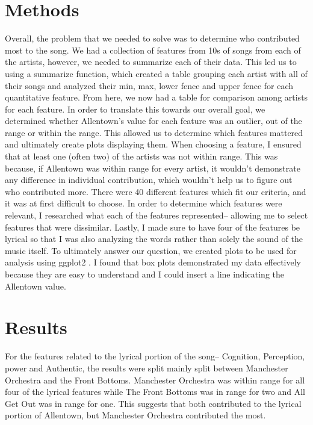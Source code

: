 \documentclass{article}\usepackage[]{graphicx}\usepackage[]{xcolor}
\begin{document}
\begin{multicols}{2}
\section{Methods}
  Overall, the problem that we needed to solve was to determine who contributed most to the song. We had a collection of features from 10s of songs from each of the artists, however, we needed to summarize each of their data. This led us to using a summarize function, which created a table grouping each artist with all of their songs and analyzed their min, max, lower fence and upper fence for each quantitative feature. From here, we now had a table for comparison among artists for each feature. In order to translate this towards our overall goal, we determined whether Allentown's value for each feature was an outlier, out of the range or within the range. This allowed us to determine which features mattered and ultimately create plots displaying them. 
  When choosing a feature, I ensured that at least one (often two) of the artists was not within range. This was because, if Allentown was within range for every artist, it wouldn't demonstrate any difference in individual contribution, which wouldn't help us to figure out who contributed more. There were 40 different features which fit our criteria, and it was at first difficult to choose. 
  In order to determine which features were relevant, I researched what each of the features represented-- allowing me to select features that were dissimilar. Lastly, I made sure to have four of the features be lyrical so that I was also analyzing the words rather than solely the sound of the music itself.
  To ultimately answer our question, we created plots to be used for analysis using ggplot2 \citep{ggplot2}. I found that box plots demonstrated my data effectively because they are easy to understand and I could insert a line indicating the Allentown value.
  
\section{Results}
  For the features related to the lyrical portion of the song-- Cognition, Perception, power and Authentic, the results were split mainly split between Manchester Orchestra and the Front Bottoms. Manchester Orchestra was within range for all four of the lyrical features while The Front Bottoms was in range for two and All Get Out was in range for one. This suggests that both contributed to the lyrical portion of Allentown, but Manchester Orchestra contributed the most. 
  

\end{multicols}
\end{document}
